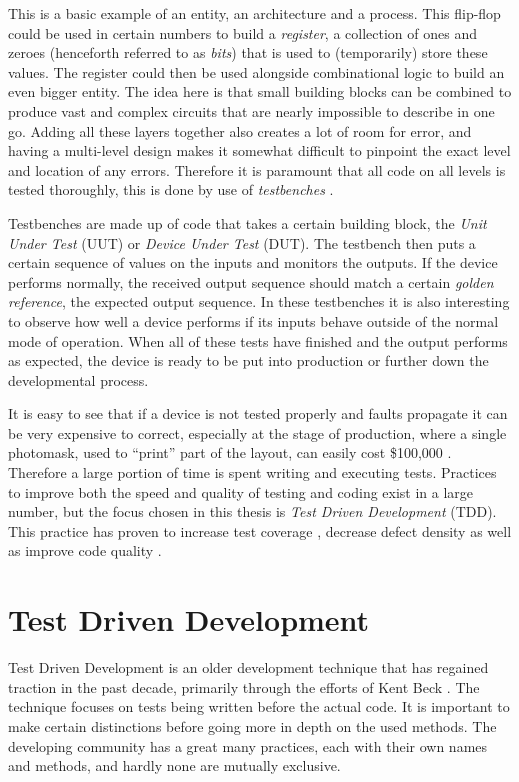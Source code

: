 \documentclass[11pt,british]{article}
\begin{document}
This is a basic example of an entity, an architecture and a process.
This flip-flop could be used in certain numbers to build a \emph{register},
a collection of ones and zeroes (henceforth referred to as \emph{bits}) that
is used to (temporarily) store these values. The register could then
be used alongside combinational logic to build an even bigger entity.
The idea here is that small building blocks can be combined to produce
vast and complex circuits that are nearly impossible to describe in
one go. Adding all these layers together also creates a lot of room
for error, and having a multi-level design makes it somewhat difficult
to pinpoint the exact level and location of any errors. Therefore
it is paramount that all code on all levels is tested thoroughly,
this is done by use of \emph{testbenches} \cite{key-2}.

Testbenches are made up of code that takes a certain building block,
the \emph{Unit Under Test} (UUT) or \emph{Device Under Test} (DUT).
The testbench then puts a certain sequence of values on the inputs and monitors
the outputs. If the device performs normally, the received output
sequence should match a certain \emph{golden reference}, the expected
output sequence. In these testbenches it is also interesting to observe
how well a device performs if its inputs behave outside of the normal
mode of operation. When all of these tests have finished and the output
performs as expected, the device is ready to be put into production
or further down the developmental process.

It is easy to see that if a device is not tested properly and faults
propagate it can be very expensive to correct, especially at the stage
of production, where a single photomask, used to ``print'' part
of the layout, can easily cost \$100,000 \cite{key-3}. Therefore a
large portion of time is spent writing and executing tests\cite{key-4}.
Practices to improve both the speed and quality of testing and coding
exist in a large number, but the focus chosen in this thesis is \emph{Test
Driven Development} (TDD). This practice has proven to increase test
coverage \cite{key-5}, decrease defect density \cite{key-8} as well
as improve code quality \cite{key-8,key-9}.

\newpage
\section{Test Driven Development}
Test Driven Development is an older development technique that has regained traction 
in the past decade, primarily through the efforts of Kent Beck \cite{key-10}. The technique focuses on tests being written before the actual code. It is important to make certain distinctions before going more in depth on the used methods. The developing community has a great many practices, each with their own names and methods, and hardly none are mutually exclusive.
\end{document}
